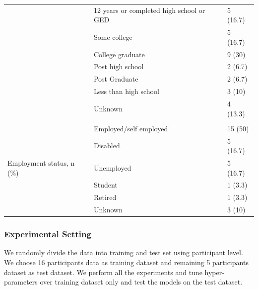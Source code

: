 \documentclass[preprint,12pt]{elsarticle}
\begin{document}
\begin{table}[H]
\begin{tabular}{|l|l|l|}
                                           & 12 years or completed high school or GED & 5 (16.7)     \\ \cline{2-3} 
                                           & Some college                             & 5 (16.7)     \\ \cline{2-3} 
                                           & College graduate                         & 9 (30)       \\ \cline{2-3} 
                                           & Post high school                         & 2 (6.7)      \\ \cline{2-3} 
                                           & Post Graduate                            & 2 (6.7)      \\ \cline{2-3} 
                                           & Less than high school                    & 3 (10)       \\ \cline{2-3} 
                                           & Unknown                                  & 4 (13.3)     \\ \hline
\multirow{7}{*}{Employment status, n (\%)} &                                          &              \\ \cline{2-3} 
                                           & Employed/self employed                   & 15 (50)      \\ \cline{2-3} 
                                           & Disabled                                 & 5 (16.7)     \\ \cline{2-3} 
                                           & Unemployed                               & 5 (16.7)     \\ \cline{2-3} 
                                           & Student                                  & 1 (3.3)      \\ \cline{2-3} 
                                           & Retired                                  & 1 (3.3)      \\ \cline{2-3} 
                                           & Unknown                                  & 3 (10)       \\ \hline
\end{tabular}
\end{table}

\subsubsection{Experimental Setting}
We randomly divide the data into training and test set using participant level. We choose 16 participants data as training dataset and remaining 5 participants dataset as test dataset. We perform all the experiments and tune hyper-parameters over training dataset only and test the models on the test dataset. 
\end{document}
